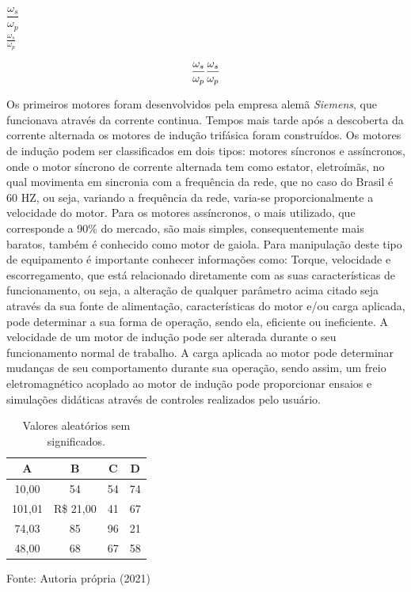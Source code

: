 \begin{center}
	$\dfrac{\omega_s}{\omega_p}$\\ 
	\vspace{5mm}
	$\frac{\omega_s}{\omega_p}$
\end{center}



\begin{equation}
	\centering
	\dfrac{\omega_s}{\omega_p} 
	\frac{\omega_s}{\omega_p}
	\label{eq:teste}
\end{equation}

Os primeiros motores foram desenvolvidos pela empresa alemã \textit{Siemens}, que funcionava através da corrente continua. Tempos mais tarde após a descoberta da corrente alternada os motores de indução trifásica foram construídos.
Os motores de indução podem ser classificados em dois tipos: motores síncronos e assíncronos, onde o motor síncrono de corrente alternada tem como estator, eletroímãs, no qual movimenta em sincronia com a frequência da rede, que no caso do Brasil é 60 HZ, ou seja, variando a frequência da rede, varia-se proporcionalmente a velocidade do motor. Para os motores assíncronos, o mais utilizado, que corresponde a 90\% do mercado, são mais simples, consequentemente mais baratos, também é conhecido como motor de gaiola.
Para manipulação deste tipo de equipamento é importante conhecer informações como: Torque, velocidade e escorregamento, que está relacionado diretamente com as suas características de funcionamento, ou seja, a alteração de qualquer parâmetro acima citado seja através da sua fonte de alimentação, características do motor e/ou carga aplicada, pode determinar a sua forma de operação, sendo ela, eficiente ou ineficiente.
A velocidade de um motor de indução pode ser alterada durante o seu funcionamento normal de trabalho. A carga aplicada ao motor pode determinar mudanças de seu comportamento durante sua operação, sendo assim, um freio eletromagnético acoplado ao motor de indução pode proporcionar ensaios e simulações didáticas através de controles realizados pelo usuário. 

\begin{table}[!h]
	\centering
	\caption[Teste]{Valores aleatórios sem significados.}
	\begin{tabular}{c|c|c|c}
		\hline
		A & B & C & D \\
		\hline
		10,00 & 54 & 54 & 74 \\
		\hline
		101,01 & R\$ 21,00 & 41 & 67 \\
		\hline
		74,03 & 85 & 96 & 21 \\
		\hline
		48,00 & 68 & 67 & 58 \\
		\hline
	\end{tabular}
	\vskip 3mm
	Fonte: Autoria própria (2021)
	\label{tab:teste}
\end{table}

